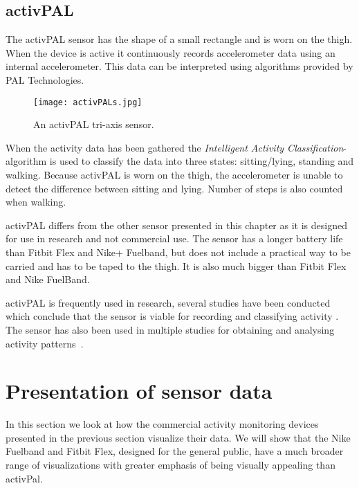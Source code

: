 \subsection{activPAL}
\label{sensorActivPal}
The activPAL sensor has the shape of a small rectangle and is worn on the thigh. When the device is active it continuously records accelerometer data using an internal accelerometer. This data can be interpreted using algorithms provided by PAL Technologies.

\begin{figure}[h!]
	\centering
		\texttt{[image: activPALs.jpg]}
		\caption{\footnotesize An activPAL tri-axis sensor.}
		\label{fig:activPal}
\end{figure}

When the activity data has been gathered the \emph{Intelligent Activity Classification}-algorithm is used to classify the data into three states: sitting/lying, standing and walking. Because activPAL is worn on the thigh, the accelerometer is unable to detect the difference between sitting and lying. Number of steps is also counted when walking.

activPAL differs from the other sensor presented in this chapter as it is designed for use in research and not commercial use. The sensor has a longer battery life than Fitbit Flex and Nike+ Fuelband, but does not include a practical way to be carried and has to be taped to the thigh. It is also much bigger than Fitbit Flex and Nike FuelBand. 

activPAL is frequently used in research, several studies have been conducted which conclude that the sensor is viable for recording and classifying activity \cite{grant2006, ryan2006, grant2008, tsavourelou}. The sensor has also been used in multiple studies for obtaining and analysing activity patterns~\cite{grant2010, lord, ryan2010}.

\section{Presentation of sensor data}
In this section we look at how the commercial activity monitoring devices presented in the previous section visualize their data. We will show that the Nike Fuelband and Fitbit Flex, designed for the general public, have a much broader range of visualizations with greater emphasis of being visually appealing than activPal.

